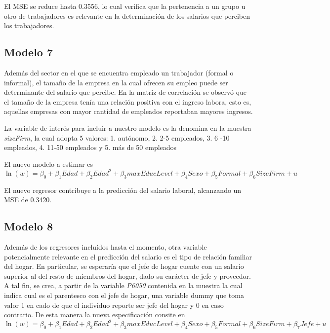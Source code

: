 \documentclass[11pt, a4paper]{article}
\begin{document}
El MSE se reduce hasta 0.3556, lo cual verifica que la pertenencia a un grupo u otro de trabajadores es relevante en la determinación de los salarios que perciben los trabajadores. 

\subsection{Modelo 7}

Además del sector en el que se encuentra empleado un trabajador (formal o informal), el tamaño de la empresa en la cual ofrecen su empleo puede ser determinante del salario que percibe. En la matriz de correlación se observó que el tamaño de la empresa tenía una relación positiva con el ingreso labora, esto es, aquellas empresas con mayor cantidad de empleados reportaban mayores ingresos. 

La variable de interés para incluir a nuestro modelo es la denomina en la muestra \textit{sizeFirm}, la cual adopta 5 valores: 1. autónomo, 2.  2-5 empleados, 3. 6 -10 empleados, 4. 11-50 empleados y 5. más de 50 empleados

El nuevo modelo a estimar es 
\begin{equation*}
\ln(w) = \beta_0 + \beta_1 \textit{Edad}  + \beta_2 \textit{Edad} ^2 + \beta_3 \textit{maxEducLevel} +\beta_4 \textit{Sexo} +\beta_5 \textit{Formal}  + \beta_6 \textit{SizeFirm} +  u
\end{equation*}

El nuevo regresor contribuye a la predicción del salario laboral, alcanzando un MSE de 0.3420.

\subsection{Modelo 8}

Además de los regresores incluídos hasta el momento, otra variable potencialmente relevante en el predicción del salario es el tipo de relación familiar del hogar. En particular, se esperaría que el jefe de hogar cuente con un salario superior al del resto de miembros del hogar, dado su carácter de jefe y proveedor. A tal fin, se crea, a partir de la variable \textit{P6050} contenida en la muestra la cual indica cual es el parentesco con el jefe de hogar,  una variable dummy que toma valor 1 en cado de que el individuo reporte ser jefe del hogar y 0 en caso contrario.  De esta manera la nueva especificación consite en 
 \begin{equation*}
\ln(w) = \beta_0 + \beta_1 \textit{Edad}  + \beta_2 \textit{Edad} ^2 + \beta_3 \textit{maxEducLevel} +\beta_4 \textit{Sexo} +\beta_5 \textit{Formal}  + \beta_6 \textit{SizeFirm} + \beta_7 \textit{Jefe} +  u
\end{equation*}
\end{document}
